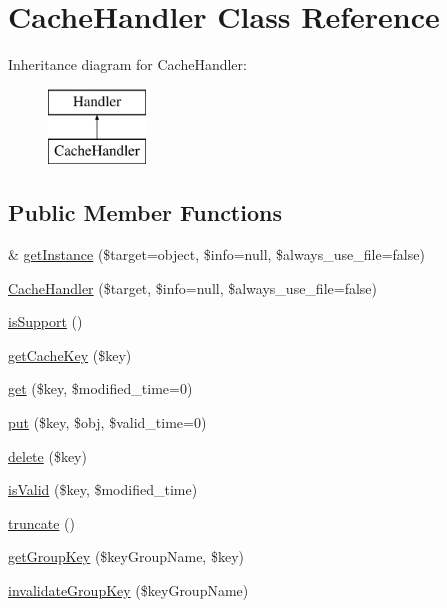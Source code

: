 \hypertarget{classCacheHandler}{}\section{Cache\+Handler Class Reference}
\label{classCacheHandler}
Inheritance diagram for Cache\+Handler\+:\begin{figure}[H]
\begin{center}
\leavevmode
\includegraphics[height=2.000000cm]{classCacheHandler}
\end{center}
\end{figure}
\subsection*{Public Member Functions}
\begin{DoxyCompactItemize}
\item 
\& \hyperlink{classCacheHandler_af6194e9a8be860303f799d8d82757397}{get\+Instance} (\$target=\textquotesingle{}object\textquotesingle{}, \$info=null, \$always\+\_\+use\+\_\+file=false)
\item 
\hyperlink{classCacheHandler_a71cb13c8791b73a8153fd5bbc7aba3e3}{Cache\+Handler} (\$target, \$info=null, \$always\+\_\+use\+\_\+file=false)
\item 
\hyperlink{classCacheHandler_a4c137721670e0e9ce1d60bdd2f7235bb}{is\+Support} ()
\item 
\hyperlink{classCacheHandler_ab849392ce5ea0d57208f39d8a6a4fa43}{get\+Cache\+Key} (\$key)
\item 
\hyperlink{classCacheHandler_af726ae7803e5a73dee47bb43fc1fb8fc}{get} (\$key, \$modified\+\_\+time=0)
\item 
\hyperlink{classCacheHandler_af7fe9532fb10504cee980d7581a31995}{put} (\$key, \$obj, \$valid\+\_\+time=0)
\item 
\hyperlink{classCacheHandler_af51c1473c877ab5e20336d0d719c27d7}{delete} (\$key)
\item 
\hyperlink{classCacheHandler_aea9da5e2293a9062bc7a5f0a4104c9ce}{is\+Valid} (\$key, \$modified\+\_\+time)
\item 
\hyperlink{classCacheHandler_a10046e23ee8c8ef41bbbb69b2dda7889}{truncate} ()
\item 
\hyperlink{classCacheHandler_ab777b6b22477848324a25346da869596}{get\+Group\+Key} (\$key\+Group\+Name, \$key)
\item 
\hyperlink{classCacheHandler_a43118f91508ad5695a13f7a332cc9389}{invalidate\+Group\+Key} (\$key\+Group\+Name)
\end{DoxyCompactItemize}
